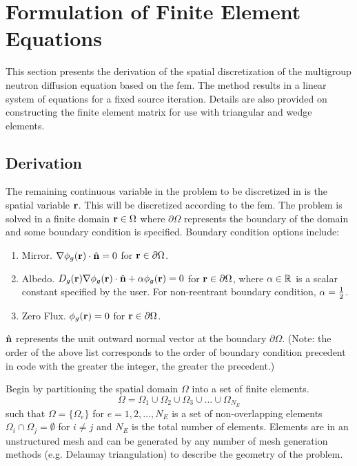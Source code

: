 \section{Formulation of Finite Element Equations}
  \label{sec:formulation}
  This section presents the derivation of the spatial discretization of the
  multigroup neutron diffusion equation based on the \gls{fem}. The method
  results in a linear system of equations for a fixed source iteration. Details
  are also provided on constructing the finite element matrix for use with
  triangular and wedge elements.

  \subsection{Derivation}
    \label{sec:formulation:derivation}
    The remaining continuous variable in the problem to be discretized in
     is the spatial variable $\mathbf{r}$. This will be 
    discretized according to the \gls{fem}. The problem is solved in a finite 
    domain $\mathbf{r} \in \Omega$ where $\partial \Omega$ represents the boundary of 
    the domain and some boundary condition is specified. Boundary condition 
    options include:
    \begin{enumerate}
      \item Mirror. $\mathbf{\nabla} \phi_g(\mathbf{r}) \cdot \hat{\mathbf{n}} = 0$ for 
        $\mathbf{r} \in \partial \Omega$.
      \item Albedo. $D_g(\mathbf{r}) \mathbf{\nabla} \phi_g(\mathbf{r}) \cdot \hat{\mathbf{n}} + 
        \alpha \phi_g(\mathbf{r})=0$ for $\mathbf{r} \in \partial \Omega$,
        where $\alpha \in \mathbb{R}$ is a scalar constant specified
        by the user. For non-reentrant boundary condition, $\alpha = \frac{1}{2}$.
      \item Zero Flux. $\phi_g(\mathbf{r}) = 0$ for $\mathbf{r} \in \partial \Omega$.
    \end{enumerate}
    $\hat{\mathbf{n}}$ represents the unit outward normal vector at the boundary $\partial
    \Omega$.
    (Note: the order of the above list corresponds to the order of boundary 
    condition precedent in code with the greater the integer, the greater the 
    precedent.)
    
    Begin by partitioning the spatial domain $\Omega$ into a set of finite 
    elements.
    \begin{equation}
      \label{eq:set_of_elements}
      \Omega = \Omega_1 \cup \Omega_2 \cup \Omega_3 \cup \ldots \cup
        \Omega_{N_E} 
    \end{equation}
    such that $\Omega = \{\Omega_e\}$ for $e = 1,2,\ldots,N_E$ is a set of
    non-overlapping elements $\Omega_i \cap \Omega_j = \emptyset$ for $i \ne j$
    and $N_E$ is the total number of elements. Elements are in an unstructured
    mesh and can be generated by any number of mesh generation methods (e.g.
    Delaunay triangulation) to describe the geometry of the problem.
    
